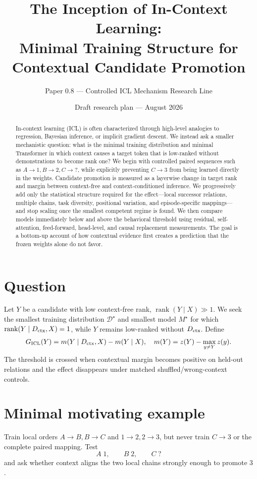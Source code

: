 \documentclass[10pt]{article}
\title{The Inception of In-Context Learning:\\Minimal Training Structure for Contextual Candidate Promotion}
\author{Paper 0.8 --- Controlled ICL Mechanism Research Line}
\date{Draft research plan --- August 2026}
\begin{document}
\maketitle
\begin{abstract}
In-context learning (ICL) is often characterized through high-level analogies to regression, Bayesian inference, or implicit gradient descent. We instead ask a smaller mechanistic question: what is the minimal training distribution and minimal Transformer in which context causes a target token that is low-ranked without demonstrations to become rank one? We begin with controlled paired sequences such as \(A\!\to\!1,B\!\to\!2,C\!\to\!?\), while explicitly preventing \(C\!\to\!3\) from being learned directly in the weights. Candidate promotion is measured as a layerwise change in target rank and margin between context-free and context-conditioned inference. We progressively add only the statistical structure required for the effect---local successor relations, multiple chains, task diversity, positional variation, and episode-specific mappings---and stop scaling once the smallest competent regime is found. We then compare models immediately below and above the behavioral threshold using residual, self-attention, feed-forward, head-level, and causal replacement measurements. The goal is a bottom-up account of how contextual evidence first creates a prediction that the frozen weights alone do not favor.
\end{abstract}
\section{Question}
Let \(Y\) be a candidate with low context-free rank, \(\operatorname{rank}(Y\mid X)\gg1\). We seek the smallest training distribution \(\mathcal D^\star\) and smallest model \(M^\star\) for which \(\operatorname{rank}(Y\mid D_{\rm ctx},X)=1\), while \(Y\) remains low-ranked without \(D_{\rm ctx}\).
Define
\[
G_{\rm ICL}(Y)=m(Y\mid D_{\rm ctx},X)-m(Y\mid X),\quad
m(Y)=z(Y)-\max_{y\ne Y}z(y).
\]
The threshold is crossed when contextual margin becomes positive on held-out relations and the effect disappears under matched shuffled/wrong-context controls.

\section{Minimal motivating example}
Train local orders \(A\to B,B\to C\) and \(1\to2,2\to3\), but never train \(C\to3\) or the complete paired mapping. Test
\[
A\;1,\qquad B\;2,\qquad C\;?
\]
and ask whether context aligns the two local chains strongly enough to promote \(3\).
\end{document}

